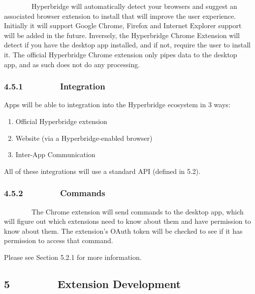 \documentclass[]{article}
\providecommand{\tightlist}{%
  \setlength{\itemsep}{0pt}\setlength{\parskip}{0pt}}
\begin{document}
{~~~~~~~~Hyperbridge will automatically detect your browsers and suggest
an associated browser extension to install that will improve the user
experience. Initially it will support Google Chrome, Firefox and
Internet Explorer support will be added in the future. Inversely, the
Hyperbridge Chrome Extension will detect if you have the desktop app
installed, and if not, require the user to install it. The official
Hyperbridge Chrome extension only pipes data to the desktop app, and as
such does not do any processing.}

{}

\hypertarget{h.uc9770gpc7sj}{%
\subsubsection{\texorpdfstring{{4.5.1~~~~~~~~Integration}}{4.5.1~~~~~~~~Integration}}\label{h.uc9770gpc7sj}}

{Apps will be able to integration into the Hyperbridge ecosystem in 3
ways:}

\begin{enumerate}
\tightlist
\item
  {Official Hyperbridge extension}
\item
  {Website (via a Hyperbridge-enabled browser)}
\item
  {Inter-App Communication}
\end{enumerate}

{}

{All of these integrations will use a standard API (defined in 5.2).}

{}

\hypertarget{h.w86r6j8myktj}{%
\subsubsection{\texorpdfstring{{4.5.2~~~~~~~~Commands}}{4.5.2~~~~~~~~Commands}}\label{h.w86r6j8myktj}}

{~~~~~~~~The Chrome extension will send commands to the desktop app,
which will figure out which extensions need to know about them and have
permission to know about them. The extension's OAuth token will be
checked to see if it has permission to access that command.}

{}

{Please see Section 5.2.1 for more information.}

{}

\hypertarget{h.s3w09nisgji0}{%
\subsection{\texorpdfstring{{5~~~~~~~~Extension
Development}}{5~~~~~~~~Extension Development}}\label{h.s3w09nisgji0}}
\end{document}
